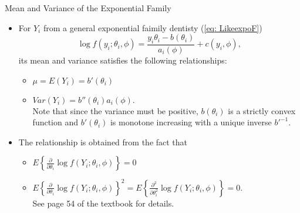 \documentclass{beamer}
\begin{document}
     
        \begin{frame}{Mean and Variance of the Exponential Family}
        \begin{itemize}
            \item For $Y_{i}$ from a general exponential faimily dentisty (\ref{eq: LikeexpoF})
                $$\log f(y_{i};\theta_{i}, \phi) = \frac{y_{i}\theta_{i}-b(\theta_{i})}{a_{i}(\phi)} + c(y_{i}, \phi),$$
                its mean and variance satisfies the following relationships:
                \begin{itemize}
                    \item $\mu = E(Y_{i}) = b'(\theta_{i})$
                    \item $Var(Y_{i}) = b''(\theta_{i})a_{i}(\phi).$\\
                    Note that since the variance must be positive, $b(\theta_{i})$ is a strictly convex function and $b'(\theta_{i})$ is monotone increasing with a unique inverse $b'^{-1}$.
                \end{itemize}
            \item  The relationship is obtained from the fact that
            \begin{itemize}
                \item $E\left\{\frac{\partial}{\partial \theta_{i}}\log f(Y_{i}; \theta_{i}, \phi)\right\} = 0$
                \item $E\left\{\frac{\partial}{\partial \theta_{i}}\log f(Y_{i}; \theta_{i}, \phi)\right\}^2 = E\left\{\frac{\partial^2}{\partial \theta_{i}^2}\log f(Y_{i}; \theta_{i}, \phi)\right\} = 0.$\\
                See page 54 of the textbook for details.
            \end{itemize}
        \end{itemize}
        \end{frame}
\end{document}
